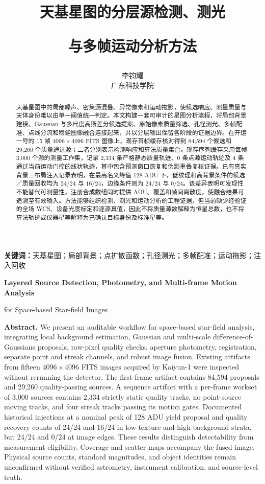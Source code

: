 \documentclass[UTF8,a4paper,11pt,fontset=windows]{ctexart}
\title{\vspace{-15pt}\heiti\LARGE 天基星图的分层源检测、测光\par 与多帧运动分析方法}
\author{李钧耀\\\small 广东科技学院}
\date{}
\begin{document}
\maketitle\thispagestyle{empty}\vspace{-18pt}
\begin{abstract}
天基星图中的局部噪声、密集源混叠、异常像素和运动拖影，使候选响应、测量质量与天体身份难以由单一阈值统一判定。本文构建一套可审计的星图分析流程，将局部背景建模、Gaussian 与多尺度高斯差分候选提案、原始像素质量筛选、孔径测光、多帧配准、点线分流和稳健图像融合连接起来，并以分层输出保留各阶段的证据边界。在开运一号的 15 帧 $4096\times4096$ FITS 图像上，现存首帧缓存核对得到 84,594 个候选和 29,260 个质量通过源；二者分别表示检测响应和算法质量集合。现存序列缓存采用每帧 3,000 个源的测量工作集，记录 2,334 条严格静态质量轨迹、0 条点源运动轨迹及 4 条通过当前运动门控的线状轨迹，其中包含预测窗口恢复和伪影重叠复核证据。已有真实背景三布局注入记录表明，在最高名义峰值 128 ADU 下，低纹理和高背景条件的候选／质量回收均为 $24/24$ 与 $16/24$，边缘条件则为 $24/24$ 与 $0/24$。该差异表明可发现性不能替代可测量性。注册合成数组同时提供 ADU、覆盖和帧间离散度，使融合结果可追溯至有效输入。方法能够组织检测、测光和运动分析的工程证据，但当前缺少经验证的全场 WCS、设备光度标定和逐源真值，因此不将质量源数解释为恒星总数，也不将算法轨迹或仪器星等解释为已确认目标身份及标准星等。
\end{abstract}
\noindent\textbf{关键词：}天基星图；局部背景；点扩散函数；孔径测光；多帧配准；运动拖影；注入回收

\vspace{10pt}
\begin{center}\bfseries\large Layered Source Detection, Photometry, and Multi-frame Motion Analysis\par for Space-based Star-field Images\end{center}
\noindent\textbf{Abstract.} We present an auditable workflow for space-based star-field analysis, integrating local background estimation, Gaussian and multi-scale difference-of-Gaussians proposals, raw-pixel quality checks, aperture photometry, registration, separate point and streak channels, and robust image fusion. Existing artifacts from fifteen $4096\times4096$ FITS images acquired by Kaiyun-1 were inspected without rerunning the detector. The first-frame artifact contains 84,594 proposals and 29,260 quality-passing sources. A sequence artifact with a per-frame workset of 3,000 sources contains 2,334 strictly static quality tracks, no point-source moving tracks, and four streak tracks passing its motion gates. Documented historical injections at a nominal peak of 128 ADU yield proposal and quality recovery counts of 24/24 and 16/24 in low-texture and high-background strata, but 24/24 and 0/24 at image edges. These results distinguish detectability from measurement eligibility. Coverage and scatter maps accompany the fused image. Physical source counts, standard magnitudes, and object identities remain unconfirmed without verified astrometry, instrument calibration, and source-level truth.
\end{document}
